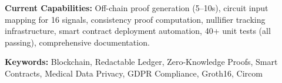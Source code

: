 \documentclass[11pt,a4paper]{article}
\begin{document}
\textbf{Current Capabilities:} Off-chain proof generation (5--10s), circuit input mapping for 16 signals, consistency proof computation, nullifier tracking infrastructure, smart contract deployment automation, 40+ unit tests (all passing), comprehensive documentation.

\vspace{1em}
\textbf{Keywords:} Blockchain, Redactable Ledger, Zero-Knowledge Proofs, Smart Contracts, Medical Data Privacy, GDPR Compliance, Groth16, Circom

\tableofcontents
\newpage









\nocite{botta2022towards,ateniese2017redactable,avitabile2024data}



\end{document}
